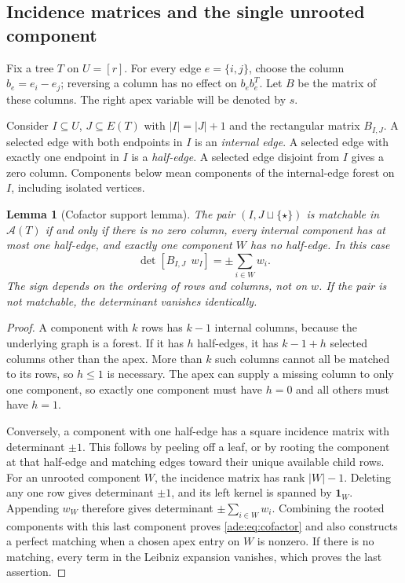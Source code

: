 \documentclass[11pt]{article}
\numberwithin{equation}{section}
\newtheorem{lemma}[theorem]{Lemma}
\theoremstyle{definition}
\newcommand{\one}{\mathbf 1}
\newcommand{\calA}{\mathcal A}
\begin{document}
\subsection{Incidence matrices and the single unrooted component}

Fix a tree $T$ on $U=[r]$.  For every edge $e=\{i,j\}$, choose the
column $b_e=e_i-e_j$; reversing a column has no effect on
$b_eb_e^T$.  Let $B$ be the matrix of these columns.
The right apex variable will be denoted by $s$.

Consider $I\subseteq U$, $J\subseteq E(T)$ with $|I|=|J|+1$ and the
rectangular matrix $B_{I,J}$.  A selected edge with both endpoints in $I$
is an \emph{internal edge}.  A selected edge with exactly one endpoint in
$I$ is a \emph{half-edge}.  A selected edge disjoint from $I$ gives a zero
column.  Components below mean components of the internal-edge forest on
$I$, including isolated vertices.

\begin{lemma}[Cofactor support lemma]
\label{ade:lem:forestcofactor}
The pair $(I,J\sqcup\{\star\})$ is matchable in $\calA(T)$ if and only if
there is no zero column, every internal component has at most one
half-edge, and exactly one component $W$ has no half-edge.
In this case
\begin{equation}
 \det[B_{I,J}\ \ w_I]=\pm\sum_{i\in W}w_i.
 \label{ade:eq:cofactor}
\end{equation}
The sign depends on the ordering of rows and columns, not on $w$.
If the pair is not matchable, the determinant vanishes identically.
\end{lemma}
\begin{proof}
A component with $k$ rows has $k-1$ internal columns, because the
underlying graph is a forest.  If it has $h$ half-edges, it has
$k-1+h$ selected columns other than the apex.  More than $k$ such columns
cannot all be matched to its rows, so $h\le1$ is necessary.  The apex can
supply a missing column to only one component, so exactly one component
must have $h=0$ and all others must have $h=1$.

Conversely, a component with one half-edge has a square incidence matrix
with determinant $\pm1$.  This follows by peeling off a leaf, or by
rooting the component at that half-edge and matching edges toward their
unique available child rows.  For an unrooted component $W$, the
incidence matrix has rank $|W|-1$.  Deleting any one row gives determinant
$\pm1$, and its left kernel is spanned by $\one_W$.  Appending $w_W$
therefore gives determinant $\pm\sum_{i\in W}w_i$.
Combining the rooted components with this last component proves
\eqref{ade:eq:cofactor} and also constructs a perfect matching when a chosen
apex entry on $W$ is nonzero.
If there is no matching, every term in the Leibniz expansion vanishes,
which proves the last assertion.
\end{proof}
\end{document}
